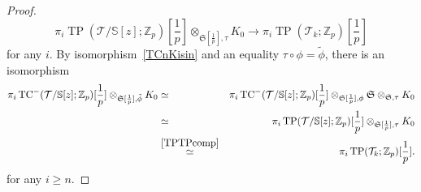\documentclass[11pt]{amsart}
\newcommand{\Z}{\mathbb{Z}}
\newcommand{\sT}{\mathcal{T}}
\newcommand{\bS}{\mathbb{S}}
\newcommand{\TP}{\operatorname{TP}}
\newcommand{\TCn}{\operatorname{TC}^{-}}
\newcommand{\mS}{\mathfrak{S}}
\theoremstyle{definition}
\theoremstyle{remark}
\numberwithin{equation}{section}
\begin{document}
\begin{proof}
\begin{equation}
\pi_i \TP(\sT/\bS[z];\Z_p)[\frac{1}{p}]\otimes_{\mS [\frac{1}{p}],\tau} K_0 \to \pi_i \TP(\sT_k;\Z_p)[\frac{1}{p}]
\end{equation}
for any $i$. By isomorphism~\eqref{TCnKisin} and an equality $\tau\circ \phi=\tilde{\phi}$, there is an isomorphism
\begin{eqnarray*}
\pi_i \TCn(\sT/\bS[z];\Z_p)[\frac{1}{p}]\otimes_{\mS [\frac{1}{p}],\tilde{\phi}} K_0 & \simeq & \pi_i \TCn(\sT/\bS[z];\Z_p)[\frac{1}{p}]\otimes_{\mS [\frac{1}{p}],\phi} \mS \otimes_{\mS,\tau} K_0 \\
&\simeq & \pi_i \TP(\sT/\bS[z];\Z_p)[\frac{1}{p}]\otimes_{\mS [\frac{1}{p}],\tau} K_0 \\
&\overset{\eqref{TPTPcomp}}{\simeq} &\pi_i \TP(\sT_k;\Z_p)[\frac{1}{p}].
\end{eqnarray*}
for any $i\geq n$.
\end{proof}
\end{document}
